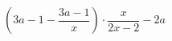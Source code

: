 \begin{ex}[type=expression]
	\begin{condition}
		\( \left( 3a-1-\dfrac{3a-1}{x} \right) \cdot\dfrac{x}{2x-2}-2a\)
	\end{condition}
\end{ex}